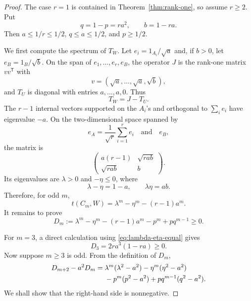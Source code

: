 \documentclass[11pt]{article}
\theoremstyle{definition}
\theoremstyle{remark}
\newcommand{\0}{\mathbf 0}
\begin{document}
\begin{proof}
The case $r=1$ is contained in Theorem~\ref{thm:rank-one}, so assume $r\ge2$.  Put
\[
        q=1-p=ra^2,
        \qquad
        b=1-ra.
\]
Then $a\le1/r\le1/2$, $q\le a\le1/2$, and $p\ge1/2$.

We first compute the spectrum of $T_W$.  Let $e_i=1_{A_i}/\sqrt a$ and, if $b>0$, let $e_B=1_B/\sqrt b$.  On the span of $e_1,\ldots,e_r,e_B$, the operator $J$ is the rank-one matrix $vv^{\mathsf T}$ with
\[
        v=(\sqrt a,\ldots,\sqrt a,\sqrt b),
\]
and $T_U$ is diagonal with entries $a,\ldots,a,0$.  Thus
\[
        T_W=J-T_U.
\]
The $r-1$ internal vectors supported on the $A_i$'s and orthogonal to $\sum_i e_i$ have eigenvalue $-a$.  On the two-dimensional space spanned by
\[
        e_A=\frac1{\sqrt r}\sum_{i=1}^r e_i
        \quad\text{and}\quad
        e_B,
\]
the matrix is
\[
        \begin{pmatrix}
        a(r-1) & \sqrt{rab}\\
        \sqrt{rab} & b
        \end{pmatrix}.
\]
Its eigenvalues are $\lambda>0$ and $-\eta\le0$, where
\begin{equation}\label{eq:lambda-eta-equal}
        \lambda-\eta=1-a,
        \qquad
        \lambda\eta=ab.
\end{equation}
Therefore, for odd $m$,
\[
        t(C_m,W)=\lambda^m-\eta^m-(r-1)a^m.
\]
It remains to prove
\begin{equation}\label{eq:Dm-nonnegative}
        D_m:=\lambda^m-\eta^m-(r-1)a^m-p^m+pq^{m-1}\ge0.
\end{equation}

For $m=3$, a direct calculation using \eqref{eq:lambda-eta-equal} gives
\begin{equation}\label{eq:D3}
        D_3=2ra^3(1-ra)\ge0.
\end{equation}
Now suppose $m\ge3$ is odd.  From the definition of $D_m$,
\begin{align}
D_{m+2}-a^2D_m
={}&
\lambda^m(\lambda^2-a^2)
-\eta^m(\eta^2-a^2)       \notag\\
&
-p^m(p^2-a^2)
+pq^{m-1}(q^2-a^2).\label{eq:D-recursion}
\end{align}
We shall show that the right-hand side is nonnegative.


\end{proof}
\end{document}
